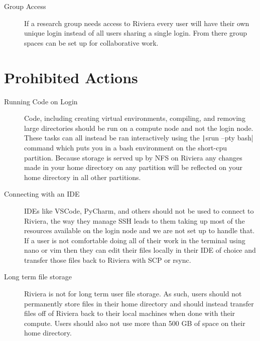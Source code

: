 \documentclass[11pt,letterpaper]{article}
\begin{document}
\begin{description}
    \item[Group Access] If a research group needs access to Riviera every user will have their own unique login instead of all users sharing a single login. From there group spaces can be set up for collaborative work. 
\end{description}

\section{Prohibited Actions}
\begin{description}
    \item[Running Code on Login] Code, including creating virtual environments, compiling, and removing large directories should be run on a compute node and not the login node. These tasks can all instead be ran interactively using the \texttt|srun --pty bash| command which puts you in a bash environment on the short-cpu partition. Because storage is served up by NFS on Riviera any changes made in your home directory on any partition will be reflected on your home directory in all other partitions.
    \item[Connecting with an IDE] IDEs like VSCode, PyCharm, and others should not be used to connect to Riviera, the way they manage SSH leads to them taking up most of the resources available on the login node and we are not set up to handle that. If a user is not comfortable doing all of their work in the terminal using nano or vim then they can edit their files locally in their IDE of choice and transfer those files back to Riviera with SCP or rsync.
    \item[Long term file storage] Riviera is not for long term user file storage. As such, users should not permanently store files in their home directory and should instead transfer files off of Riviera back to their local machines when done with their compute. Users should also not use more than 500 GB of space on their home directory.  
\end{description}
\end{document}
